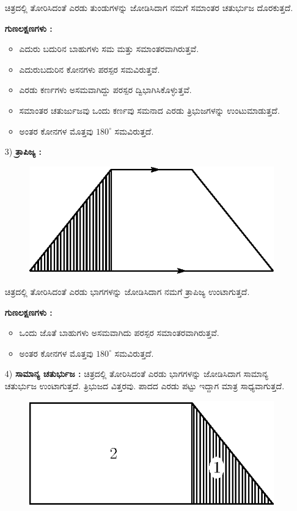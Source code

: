 \begin{enumerate}
 ಚಿತ್ರದಲ್ಲಿ ತೋರಿಸಿದಂತೆ ಎರಡು ತುಂಡುಗಳನ್ನು ಜೋಡಿಸಿದಾಗ ನಮಗೆ ಸಮಾಂತರ ಚತುರ್ಭುಜ ದೊರಕುತ್ತದೆ. 

\medskip 
 \textbf{ಗುಣಲಕ್ಷಣಗಳು :}
 \begin{itemize}
 \item ಎದುರು ಬದುರಿನ ಬಾಹುಗಳು ಸಮ ಮತ್ತು ಸಮಾಂತರವಾಗಿರುತ್ತವೆ.
 \item ಎದುರುಬದುರಿನ ಕೋನಗಳು ಪರಸ್ಪರ ಸಮವಿರುತ್ತವೆ. 
 \item ಎರಡು ಕರ್ಣಗಳು ಅಸಮವಾಗಿದ್ದು ಪರಸ್ಪರ ದ್ವಿಭಾಗಿಸಿಕೊಳ್ಳುತ್ತವೆ.
 \item  ಸಮಾಂತರ ಚತುರ್ಜುಜವು ಒಂದು ಕರ್ಣವು ಸಮನಾದ ಎರಡು ತ್ರಿಭುಜಗಳನ್ನು ಉಂಟುಮಾಡುತ್ತದೆ.
 \item ಅಂತರ ಕೋನಗಳ ಮೊತ್ತವು $180^\circ$ ಸಮವಿರುತ್ತದೆ. 
 \end{itemize}

\eject
   
 
 \item[3)] \textbf{ತ್ರಾಪಿಜ್ಯ :}
   \begin{figure}[H]
\centering
\includegraphics[scale=.98]{src/figure/chap1/fig1-41b.eps}
\end{figure}
 
 ಚಿತ್ರದಲ್ಲಿ ತೋರಿಸಿದಂತೆ ಎರಡು ಭಾಗಗಳನ್ನು ಜೋಡಿಸಿದಾಗ ನಮಗೆ ತ್ರಾಪಿಜ್ಯ ಉಂಟಾಗುತ್ತದೆ. 
 
 \medskip 
 \textbf{ಗುಣಲಕ್ಷಣಗಳು :}
 \begin{itemize}
 \item ಒಂದು ಜೊತೆ ಬಾಹುಗಳು ಅಸಮವಾಗಿದು ಪರಸ್ಪರ ಸಮಾಂತರವಾಗಿರುತ್ತವೆ.
 \item ಅಂತರ ಕೋನಗಳ ಮೊತ್ತವು $180^\circ$ ಸಮವಿರುತ್ತದೆ. 
   \end{itemize}
 
 
 \item[4)] \textbf{ಸಾಮಾನ್ಯ ಚತುರ್ಭುಜ :} ಚಿತ್ರದಲ್ಲಿ ತೋರಿಸಿದಂತೆ ಎರಡು ಭಾಗಗಳನ್ನು ಜೋಡಿಸಿದಾಗ ಸಾಮಾನ್ಯ ಚತುರ್ಭುಜ ಉಂಟಾಗುತ್ತದೆ. ತ್ರಿಭುಜದ ವಿತ್ತರವು. ಪಾದದ ಎರಡು ಪಟ್ಟು ಇದ್ದಾಗ ಮಾತ್ರ ಸಾಧ್ಯವಾಗುತ್ತದೆ. 
   \begin{figure}[H]
\centering
\includegraphics[scale=.98]{src/figure/chap1/fig1-41c.eps}
\end{figure}
 

\end{enumerate}
